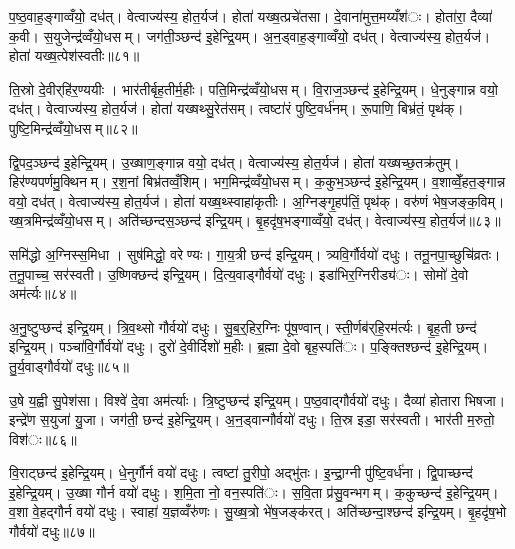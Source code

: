 प॒ष्ठ॒वाह॒ङ्गाव्वँयो॒ दध॑त्। वेत्वाज्य॑स्य॒ होत॒र्यज॑। होता॑ यख्ष॒त्प्रचे॑तसा। दे॒वाना॑मुत्त॒मय्यँश॑ः। होता॑रा॒ दैव्या॑ क॒वी। स॒युजेन्द्र॑व्वँयो॒धसम्। जग॑ती॒ञ्छन्द॑ इ॒हेन्द्रि॒यम्। अ॒न॒ड्वाह॒ङ्गाव्वँयो॒ दध॑त्। वेत्वाज्य॑स्य॒ होत॒र्यज॑। होता॑ यख्ष॒त्पेश॑स्वतीः॥८१॥

ति॒स्रो दे॒वीर्‌हि॑र॒ण्ययीः। भार॑तीर्बृह॒तीर्म॒हीः। पति॒मिन्द्र॑व्वँयो॒धसम्। वि॒राज॒ञ्छन्द॑ इ॒हेन्द्रि॒यम्। धे॒नुङ्गान्न वयो॒ दध॑त्। वेत्वाज्य॑स्य॒ होत॒र्यज॑। होता॑ यख्षथ्सु॒रेत॑सम्। त्वष्टा॑रं पुष्टि॒वर्ध॑नम्। रू॒पाणि॒ बिभ्र॑तं॒ पृथ॑क्। पुष्टि॒मिन्द्र॑व्वँयो॒धसम्॥८२॥

द्वि॒पद॒ञ्छन्द॑ इ॒हेन्द्रि॒यम्। उ॒ख्षाण॒ङ्गान्न वयो॒ दध॑त्। वेत्वाज्य॑स्य॒ होत॒र्यज॑। होता॑ यख्षच्छ॒तक्र॑तुम्। हिर॑ण्यपर्णमु॒क्थिनम्। र॒श॒नां बिभ्र॑तव्वँ॒शिम्। भग॒मिन्द्र॑व्वँयो॒धसम्। क॒कुभ॒ञ्छन्द॑ इ॒हेन्द्रि॒यम्। व॒शाव्वेँ॒हत॒ङ्गान्न वयो॒ दध॑त्। वेत्वाज्य॑स्य॒ होत॒र्यज॑। होता॑ यख्ष॒थ्स्वाहा॑कृतीः। अ॒ग्निङ्गृ॒हप॑तिं॒ पृथ॑क्। वरु॑णं भेष॒जङ्क॒विम्। ख्ष॒त्रमिन्द्र॑व्वँयो॒धसम्। अति॑च्छन्दस॒ञ्छन्द॑ इन्द्रि॒यम्। बृ॒हदृ॑ष॒भङ्गाव्वँयो॒ दध॑त्। वेत्वाज्य॑स्य॒ होत॒र्यज॑॥८३॥


समि॑द्धो अ॒ग्निस्स॒मिधा। सुष॑मिद्धो॒ वरेण्यः। गा॒य॒त्री छन्द॑ इन्द्रि॒यम्। त्र्यवि॒र्गौर्वयो॑ दधुः। तनू॒नपा॒च्छुचि॑व्रतः। त॒नू॒पाच्च॒ सर॑स्वती। उ॒ष्णिक्छन्द॑ इन्द्रि॒यम्। दि॒त्य॒वाड्गौर्वयो॑ दधुः। इडा॑भिर॒ग्निरीड्य॑ः। सोमो॑ दे॒वो अम॑र्त्यः॥८४॥

अ॒नु॒ष्टुप्छन्द॑ इन्द्रि॒यम्। त्रि॒व॒थ्सो गौर्वयो॑ दधुः। सु॒ब॒र्॒हिर॒ग्निः पू॑ष॒ण्वान्। स्ती॒र्णब॑र्‌हि॒रम॑र्त्यः। बृ॒ह॒ती छन्द॑ इन्द्रि॒यम्। पञ्चा॑वि॒र्गौर्वयो॑ दधुः। दुरो॑ दे॒वीर्दिशो॑ म॒हीः। ब्र॒ह्मा दे॒वो बृह॒स्पति॑ः। प॒ङ्क्तिश्छन्द॑ इ॒हेन्द्रि॒यम्। तु॒र्य॒वाड्गौर्वयो॑ दधुः॥८५॥

उ॒षे य॒ह्वी सु॒पेश॑सा। विश्वे॑ दे॒वा अम॑र्त्याः। त्रि॒ष्टुप्छन्द॑ इन्द्रि॒यम्। प॒ष्ठ॒वाद्गौर्वयो॑ दधुः। दैव्या॑ होतारा भिषजा। इन्द्रे॑ण स॒युजा॑ यु॒जा। जग॑ती॒ छन्द॑ इ॒हेन्द्रि॒यम्। अ॒न॒ड्वान्गौर्वयो॑ दधुः। ति॒स्र इडा॒ सर॑स्वती। भार॑ती म॒रुतो॒ विश॑ः॥८६॥

वि॒राट्छन्द॑ इ॒हेन्द्रि॒यम्। धे॒नुर्गौर्न वयो॑ दधुः। त्वष्टा॑ तु॒रीपो॒ अद्भु॑तः। इ॒न्द्रा॒ग्नी पु॑ष्टि॒वर्ध॑ना। द्वि॒पाच्छन्द॑ इ॒हेन्द्रि॒यम्। उ॒ख्षा गौर्न वयो॑ दधुः। श॒मि॒ता नो॒ वन॒स्पति॑ः। स॒वि॒ता प्र॑सु॒वन्भगम्। क॒कुच्छन्द॑ इ॒हेन्द्रि॒यम्। व॒शा वे॒हद्गौर्न वयो॑ दधुः। स्वाहा॑ य॒ज्ञव्वँरु॑णः। सु॒ख्ष॒त्रो भे॑ष॒जङ्क॑रत्। अति॑च्छन्दा॒श्छन्द॑ इन्द्रि॒यम्। बृ॒हदृ॑ष॒भो गौर्वयो॑ दधुः॥८७॥

